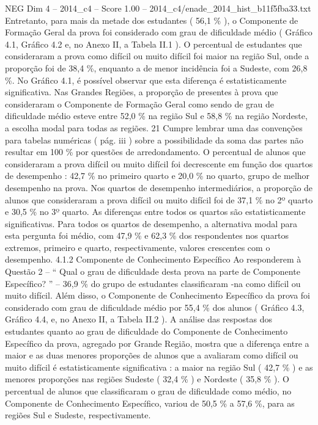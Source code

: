 \begin{textsample}{NEG Dim 4 – 2014\_c4 – Score 1.00 – 2014\_c4/enade\_2014\_hist\_b11f5fba33.txt}
Entretanto, para mais da metade dos estudantes ( 56,1 \% ), o Componente de Formação Geral da prova foi considerado com grau de dificuldade médio ( Gráfico 4.1, Gráfico 4.2 e, no Anexo II, a Tabela II.1 ).
O percentual de estudantes que consideraram a prova como difícil ou muito difícil foi maior na região Sul, onde a proporção foi de 38,4 \%, enquanto a de menor incidência foi a Sudeste, com 26,8 \%.
No Gráfico 4.1, é possível observar que esta diferença é estatisticamente significativa.
Nas Grandes Regiões, a proporção de presentes à prova que consideraram o Componente de Formação Geral como sendo de grau de dificuldade médio esteve entre 52,0 \% na região Sul e 58,8 \% na região Nordeste, a escolha modal para todas as regiões. 21 Cumpre lembrar uma das convenções para tabelas numéricas ( pág. iii ) sobre a possibilidade da soma das partes não resultar em 100 \% por questões de arredondamento.
O percentual de alunos que consideraram a prova difícil ou muito difícil foi decrescente em função dos quartos de desempenho : 42,7 \% no primeiro quarto e 20,0 \% no quarto, grupo de melhor desempenho na prova.
Nos quartos de desempenho intermediários, a proporção de alunos que consideraram a prova difícil ou muito difícil foi de 37,1 \% no 2º quarto e 30,5 \% no 3º quarto.
As diferenças entre todos os quartos são estatisticamente significativas.
Para todos os quartos de desempenho, a alternativa modal para esta pergunta foi médio, com 47,9 \% e 62,3 \% dos respondentes nos quartos extremos, primeiro e quarto, respectivamente, valores crescentes com o desempenho. 4.1.2 Componente de Conhecimento Específico Ao responderem à Questão 2 – “ Qual o grau de dificuldade desta prova na parte de Componente Específico? ” – 36,9 \% do grupo de estudantes classificaram -na como difícil ou muito difícil.
Além disso, o Componente de Conhecimento Específico da prova foi considerado com grau de dificuldade médio por 55,4 \% dos alunos ( Gráfico 4.3, Gráfico 4.4, e, no Anexo II, a Tabela II.2 ).
A análise das respostas dos estudantes quanto ao grau de dificuldade do Componente de Conhecimento Específico da prova, agregado por Grande Região, mostra que a diferença entre a maior e as duas menores proporções de alunos que a avaliaram como difícil ou muito difícil é estatisticamente significativa : a maior na região Sul ( 42,7 \% ) e as menores proporções nas regiões Sudeste ( 32,4 \% ) e Nordeste ( 35,8 \% ).
O percentual de alunos que classificaram o grau de dificuldade como médio, no Componente de Conhecimento Específico, variou de 50,5 \% a 57,6 \%, para as regiões Sul e Sudeste, respectivamente.

\end{textsample}
